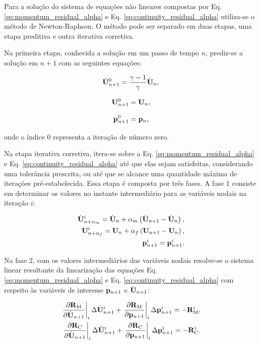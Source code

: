 \documentclass[tese_patricia]{subfiles}%
\begin{document}
Para a solução do sistema de equações não lineares compostas por Eq. \eqref{eq:momentum_residual_alpha} e Eq. \eqref{eq:continuity_residual_alpha} utiliza-se o método de Newton-Raphson. O método pode ser separado em duas etapas, uma etapa preditiva e outra iterativa corretiva.

Na primeira etapa, conhecida a solução em um passo de tempo $n$, prediz-se a solução em $n+1$ com as seguintes equações:

\begin{align}
\dot{\mathbf{U}}_{n+1}^{0} = \frac{\gamma-1}{\gamma}\dot{\mathbf{U}}_{n} \label{eq:Pred1},
\end{align}

\begin{align}
\mathbf{U}_{n+1}^{0} = \mathbf{U}_{n}, \label{eq:Pred2}
\end{align}

\begin{align}
\mathbf{p}_{n+1}^{0} = \mathbf{p}_{n},\label{eq:Pred3}
\end{align}

\noindent onde o índice $0$ representa a iteração de número zero. 

Na etapa iterativa corretiva, itera-se sobre a Eq. \eqref{eq:momentum_residual_alpha} e Eq. \eqref{eq:continuity_residual_alpha} até que elas sejam satisfeitas, considerando uma tolerância prescrita, ou até que se alcance uma quantidade máxima de iterações pré-estabelecida. Essa etapa é composta por três fases. A fase 1 consiste em determinar os valores no instante intermediário para as variáveis nodais na iteração $i$:

\begin{align}
\dot{\mathbf{U}}_{n+\alpha_m}^{i} = \dot{\mathbf{U}}_n + \alpha_m \left( \dot{\mathbf{U}}_{n+1} - \dot{\mathbf{U}}_n \right), \label{eq:approx_accelerationI}\\
\mathbf{U}_{n+\alpha_f}^{i} = \mathbf{U}_n + \alpha_f \left( \mathbf{U}_{n+1} - \mathbf{U}_n \right), \label{eq:approx_velocityI}\\
\mathbf{p}_{n+1}^{i} = \mathbf{p}_{n+1}^{i} \label{eq:approx_pressI}.
\end{align}

Na fase 2, com os valores intermediários das variáveis nodais resolve-se o sistema linear resultante da linearização das equações Eq. \eqref{eq:momentum_residual_alpha} e Eq. \eqref{eq:continuity_residual_alpha} com respeito às variáveis de interesse $\mathbf{p}_{n+1}$ e $\dot{\mathbf{U}}_{n+1}$:

\begin{align}
\left .\frac{\partial\mathbf{R}_\mathrm{M}}{\partial\dot{\mathbf{U}}_{n+1}}\right|_{i} \Delta \dot{\mathbf{U}}_{n+1}^{i} + \left .\frac{\partial\mathbf{R}_\mathrm{M}}{\partial\mathbf{p}_{n+1}}\right|_{i} \Delta \mathbf{p}_{n+1}^{i} = -\mathbf{R}_\mathrm{M}^{i}, \label{eq:NR1} \\
\left .\frac{\partial\mathbf{R}_\mathrm{C}}{\partial\dot{\mathbf{U}}_{n+1}}\right|_{i} \Delta \dot{\mathbf{U}}_{n+1}^{i} + \left .\frac{\partial\mathbf{R}_\mathrm{C}}{\partial\mathbf{p}_{n+1}}\right|_{i} \Delta \mathbf{p}_{n+1}^{i} = -\mathbf{R}_\mathrm{C}^{i}.\label{eq:NR2}
\end{align}
\end{document}
